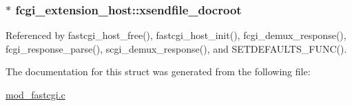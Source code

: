 \hypertarget{structfcgi__extension__host_a1304d5929c12516a150b78a59139a0b0}{
\subsubsection[{xsendfile\-\_\-docroot}]{$\ast$ fcgi\-\_\-extension\-\_\-host\-::xsendfile\-\_\-docroot}}\label{structfcgi__extension__host_a1304d5929c12516a150b78a59139a0b0}


Referenced by fastcgi\-\_\-host\-\_\-free(), fastcgi\-\_\-host\-\_\-init(), fcgi\-\_\-demux\-\_\-response(), fcgi\-\_\-response\-\_\-parse(), scgi\-\_\-demux\-\_\-response(), and S\-E\-T\-D\-E\-F\-A\-U\-L\-T\-S\-\_\-\-F\-U\-N\-C().



The documentation for this struct was generated from the following file\-:\begin{DoxyCompactItemize}
\item 
\hyperlink{mod__fastcgi_8c}{mod\-\_\-fastcgi.\-c}\end{DoxyCompactItemize}
